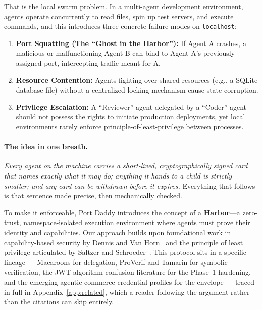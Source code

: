 \documentclass[11pt,a4paper]{article}
\theoremstyle{definition}
\begin{document}
That is the local swarm problem. In a multi-agent development environment, agents operate concurrently to read files, spin up test servers, and execute commands, and this introduces three concrete failure modes on \texttt{localhost}:

\begin{enumerate}
  \item \textbf{Port Squatting (The ``Ghost in the Harbor''):} If Agent A crashes, a malicious or malfunctioning Agent B can bind to Agent A's previously assigned port, intercepting traffic meant for A.
  
  \item \textbf{Resource Contention:} Agents fighting over shared resources (e.g., a SQLite database file) without a centralized locking mechanism cause state corruption.
  
  \item \textbf{Privilege Escalation:} A ``Reviewer'' agent delegated by a ``Coder'' agent should not possess the rights to initiate production deployments, yet local environments rarely enforce principle-of-least-privilege between processes.
\end{enumerate}

\paragraph{The idea in one breath.} \emph{Every agent on the machine carries a short-lived, cryptographically signed card that names exactly what it may do; anything it hands to a child is strictly smaller; and any card can be withdrawn before it expires.} Everything that follows is that sentence made precise, then mechanically checked.

To make it enforceable, Port Daddy introduces the concept of a \textbf{Harbor}---a zero-trust, namespace-isolated execution environment where agents must prove their identity and capabilities. Our approach builds upon foundational work in capability-based security by Dennis and Van Horn~\cite{dennis1966programming} and the principle of least privilege articulated by Saltzer and Schroeder~\cite{saltzer1975protection}. This protocol sits in a specific lineage --- Macaroons for delegation, ProVerif and Tamarin for symbolic verification, the JWT algorithm-confusion literature for the Phase~1 hardening, and the emerging agentic-commerce credential profiles for the envelope --- traced in full in Appendix~\ref{app:related}, which a reader following the argument rather than the citations can skip entirely.
\end{document}
